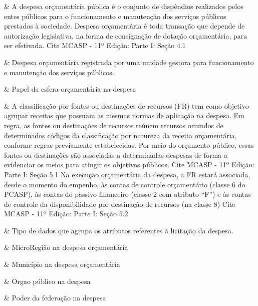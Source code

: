 &
A despesa orçamentária pública é o conjunto de dispêndios realizados pelos entes públicos para o funcionamento e manutenção dos serviços públicos prestados à sociedade. Despesa orçamentária é toda transação que depende de autorização legislativa, na forma de consignação de dotação orçamentária, para ser efetivada. Cite MCASP - 11º Edição: Parte I: Seção 4.1 
\\ \hline

 &
Despesa orçamentária registrada por uma unidade gestora para funcionamento e manutenção dos serviços públicos. 
\\ \hline

 &
Papel da esfera orçamentária na despesa 
\\ \hline

 &
A classificação por fontes ou destinações de recursos (FR) tem como objetivo agrupar receitas que possuam as mesmas normas de aplicação na despesa. Em regra, as fontes ou destinações de recursos reúnem recursos oriundos de determinados códigos da classificação por natureza da receita orçamentária, conforme regras previamente estabelecidas. Por meio do orçamento público, essas fontes ou destinações são associadas a determinadas despesas de forma a evidenciar os meios para atingir os objetivos públicos. Cite MCASP - 11º Edição: Parte I: Seção 5.1 Na execução orçamentária da despesa, a FR estará associada, desde o momento do empenho, às contas de controle orçamentário (classe 6 do PCASP), às contas do passivo financeiro (classe 2 com atributo “F”) e às contas de controle da disponibilidade por destinação de recursos (na classe 8) Cite MCASP - 11º Edição: Parte I: Seção 5.2 
\\ \hline

 &
Tipo de dados que agrupa os atributos referentes à licitação da despesa. 
\\ \hline

 &
MicroRegião na despesa orçamentária 
\\ \hline

 &
Município na despesa orçamentária 
\\ \hline

 &
Orgao público na despesa 
\\ \hline

 &
Poder da federação na despesa 
\\ \hline

